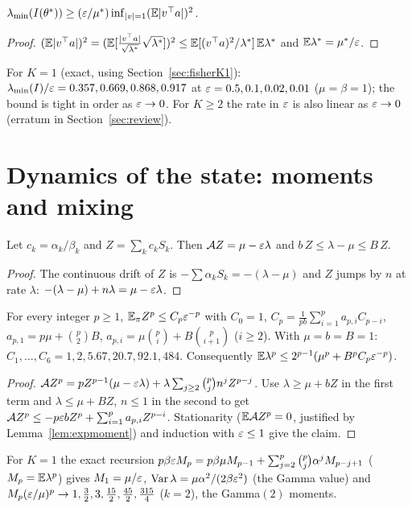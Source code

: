 \begin{lemma}\label{lem:lammin}\Pt{}
$\lambda_{\min}(I(\theta^*))\ge(\varepsilon/\mu^*)\inf_{|v|=1}(\mathbb{E}|v^{\top} a|)^2$.
\end{lemma}
\begin{proof}
$(\mathbb{E}|v^{\top} a|)^2=(\mathbb{E}[\tfrac{|v^{\top} a|}{\sqrt{\lambda^*}}\sqrt{\lambda^*}])^2\le\mathbb{E}[(v^{\top} a)^2/\lambda^*]\,\mathbb{E}\lambda^*$ and $\mathbb{E}\lambda^*=\mu^*/\varepsilon$.
\end{proof}
For $K=1$ (exact, using Section~\ref{sec:fisherK1}): $\lambda_{\min}(I)/\varepsilon=0.357,0.669,0.868,0.917$ at $\varepsilon=0.5,0.1,0.02,0.01$ ($\mu=\beta=1$); the bound is tight in order as $\varepsilon\to0$.
For $K\ge2$ the rate in $\varepsilon$ is also linear as $\varepsilon\to0$ (erratum in Section~\ref{sec:review}).

\section{Dynamics of the state: moments and mixing}\label{sec:dynamics}

\begin{proposition}\label{prop:keyid}\Pt{}
Let $c_k=\alpha_k/\beta_k$ and $Z=\sum_kc_kS_k$. Then $\mathcal A Z=\mu-\varepsilon\lambda$ and $b\,Z\le\lambda-\mu\le B\,Z$.
\end{proposition}
\begin{proof}
The continuous drift of $Z$ is $-\sum\alpha_kS_k=-(\lambda-\mu)$ and $Z$ jumps by $n$ at rate $\lambda$: $-(\lambda-\mu)+n\lambda=\mu-\varepsilon\lambda$.
\end{proof}

\begin{lemma}\label{lem:moments}\Pt{}
For every integer $p\ge1$, $\mathbb{E}_\pi Z^p\le C_p\varepsilon^{-p}$ with $C_0=1$, $C_p=\frac1{pb}\sum_{i=1}^pa_{p,i}C_{p-i}$,
$a_{p,1}=p\mu+\binom p2B$, $a_{p,i}=\mu\binom pi+B\binom p{i+1}$ ($i\ge2$). With $\mu=b=B=1$: $C_1,\dots,C_6=1,2,5.67,20.7,92.1,484$.
Consequently $\mathbb{E}\lambda^p\le2^{p-1}(\mu^p+B^pC_p\varepsilon^{-p})$.
\end{lemma}
\begin{proof}
$\mathcal A Z^p=pZ^{p-1}(\mu-\varepsilon\lambda)+\lambda\sum_{j\ge2}\binom pjn^jZ^{p-j}$. Use $\lambda\ge\mu+bZ$ in the first term and $\lambda\le\mu+BZ$, $n\le1$ in the second to get
$\mathcal A Z^p\le-p\varepsilon bZ^p+\sum_{i=1}^pa_{p,i}Z^{p-i}$. Stationarity ($\mathbb{E}\mathcal A Z^p=0$, justified by Lemma~\ref{lem:expmoment}) and induction with $\varepsilon\le1$ give the claim.
\end{proof}
For $K=1$ the exact recursion $p\beta\varepsilon M_p=p\beta\mu M_{p-1}+\sum_{j=2}^p\binom pj\alpha^jM_{p-j+1}$ ($M_p=\mathbb{E}\lambda^p$) gives
$M_1=\mu/\varepsilon$, $\operatorname{Var}\lambda=\mu\alpha^2/(2\beta\varepsilon^2)$ (the Gamma value) and $M_p(\varepsilon/\mu)^p\to1,\tfrac32,3,\tfrac{15}2,\tfrac{45}2,\tfrac{315}4$ ($k=2$), the Gamma$(2)$ moments.

